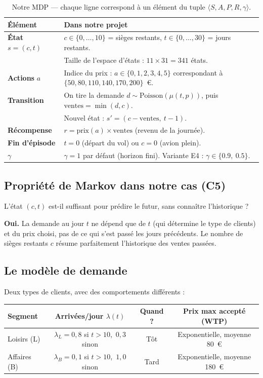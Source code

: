\documentclass[11pt,a4paper]{article}
\begin{document}
\begin{table}[h]
\centering
\begin{tabular}{@{}lp{10cm}@{}}
\toprule
\textbf{Élément} & \textbf{Dans notre projet} \\
\midrule
\textbf{État} $s = (c, t)$ & $c \in \{0, \ldots, 10\}$ = sièges restants, $t \in \{0, \ldots, 30\}$ = jours restants. \\
& Taille de l'espace d'états : $11 \times 31 = 341$ états. \\
\textbf{Actions} $a$ & Indice du prix : $a \in \{0,1,2,3,4,5\}$ correspondant à $\{50, 80, 110, 140, 170, 200\}$~€. \\
\textbf{Transition} & On tire la demande $d \sim \text{Poisson}(\mu(t, p))$, puis $\text{ventes} = \min(d, c)$. \\
& Nouvel état : $s' = (c - \text{ventes},\ t - 1)$. \\
\textbf{Récompense} & $r = \text{prix}(a) \times \text{ventes}$ (revenu de la journée). \\
\textbf{Fin d'épisode} & $t = 0$ (départ du vol) ou $c = 0$ (avion plein). \\
$\gamma$ & $\gamma = 1$ par défaut (horizon fini). Variante E4 : $\gamma \in \{0.9,\ 0.5\}$. \\
\bottomrule
\end{tabular}
\caption{Notre MDP — chaque ligne correspond à un élément du tuple $\langle S, A, P, R, \gamma \rangle$.}
\end{table}

\subsection{Propriété de Markov dans notre cas (C5)}

L'état $(c, t)$ est-il suffisant pour prédire le futur, sans connaître l'historique ?

\textbf{Oui.} La demande au jour $t$ ne dépend que de $t$ (qui détermine le type de clients) et du prix choisi, pas de ce qui s'est passé les jours précédents. Le nombre de sièges restants $c$ résume parfaitement l'historique des ventes passées.

\subsection{Le modèle de demande}

Deux types de clients, avec des comportements différents :

\begin{table}[h]
\centering
\begin{tabular}{@{}lccc@{}}
\toprule
\textbf{Segment} & \textbf{Arrivées/jour $\lambda(t)$} & \textbf{Quand ?} & \textbf{Prix max accepté (WTP)} \\
\midrule
Loisirs (L) & $\lambda_L = 0{,}8$ si $t > 10$,\ $0{,}3$ sinon & Tôt & Exponentielle, moyenne 80~€ \\
Affaires (B) & $\lambda_B = 0{,}1$ si $t > 10$,\ $1{,}0$ sinon & Tard & Exponentielle, moyenne 180~€ \\
\bottomrule
\end{tabular}
\end{table}
\end{document}
